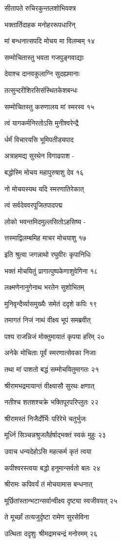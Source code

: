 सीतापते रुचिरकुन्तलशोभिवक्त्र

भक्तार्तिदाहक मनोहररूपधारिन्

मां बन्धनात्सपदि मोचय मा विलम्बम् १४

सम्मोचितास्तु भवता गजपुङ्गवाद्याः

देवाश्च दानवकुलाग्नि सुदह्यमानाः

तत्सुन्दरीशिरसिसंस्थितकेशबन्धः

सम्मोचितस्तु करुणालय मां स्मरस्व १५

त्वं यागकर्मनिरतोऽसि मुनीश्वरेन्द्रै

र्धर्मं विचारयसि भूमिपतीड्यपाद

अत्राहमद्य सुरथेन विगाढपाश -

बद्धोस्मि मोचय महापुरुषाशु देव १६

नो मोचयस्यथ यदि स्मरणातिरेकात्

त्वं सर्वदेववरपूजितपादपद्म

लोको भवन्तमिदमुल्लसितोऽहसिष्य -

त्तस्माद्विलम्बमिह माचर मोचयाशु १७

इति श्रुत्वा जगन्नाथो रघुवीरः कृपानिधिः

भक्तं मोचयितुं प्रागात्पुष्पकेणाशुवेगिना १८

लक्ष्मणेनानुगेनाथ भरतेन सुशोभितम्

मुनिवृन्दैर्व्यासमुख्यैः समेतं ददृशे कपिः १९

तमागतं निजं नाथं वीक्ष्य भूपं समब्रवीत्

पश्य राजन्निजं मोक्तुमायातं कृपया हरिम् २०

अनेके मोचिताः पूर्वं स्मरणात्सेवका निजाः

तथा मां पाशतो बद्धं सम्मोचयितुमागतः २१

श्रीरामभद्रमायान्तं वीक्ष्यासौ सुरथः क्षणात्

नतीश्च शतशश्चक्रे भक्तिपूरपरिप्लुतः २२

श्रीरामस्तं निजैर्दोर्भिः परिरेभे चतुर्भुजः

मूर्ध्नि सिञ्चन्नश्रुजलैर्हर्षाद्भक्तं स्वकं मुहुः २३

उवाच धन्यदेहोऽसि महत्कर्म कृतं त्वया

कपीश्वरस्त्वया बद्धो हनूमान्सर्वतो बलः २४

श्रीरामः कपिवर्यं तं मोचयामास बन्धनात्

मूर्छितांस्तान्भटान्सर्वान्वीक्ष्य दृष्ट्या स्वजीवयत् २५

ते मूर्च्छां तत्यजुर्दृष्टा रामेण सुरसेविना

उत्थिता ददृशुः श्रीमद्रामचन्द्रं मनोरमम् २६

